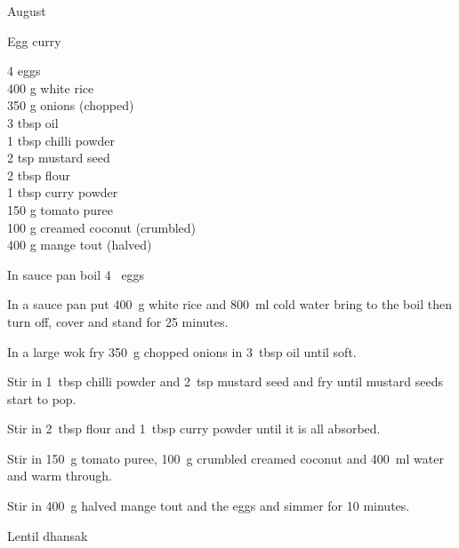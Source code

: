 \begin{menu}{August}
\begin{recipe}{2}{Egg curry}
		\begin{ingredients}
		4  eggs  \\
	400 g white rice  \\
	350 g onions (chopped) \\
	3 tbsp oil  \\
	1 tbsp chilli powder  \\
	2 tsp mustard seed  \\
	2 tbsp flour  \\
	1 tbsp curry powder  \\
	150 g tomato puree  \\
	100 g creamed coconut (crumbled) \\
	400 g mange tout (halved) \\
	
		\end{ingredients}
	
	
    \begin{instructions}
    \item 
        In sauce pan boil
        4~  eggs\item 
      In a
      sauce pan
      put
      400~g  white rice
      and
      800~ml  cold water
      bring to the boil then turn off, cover and stand for 25 minutes.
    \item 
        In a large wok fry
        350~g chopped onions
        in
        3~tbsp  oil
        until soft.
      \item 
        Stir in 1~tbsp  chilli powder
        and
        2~tsp  mustard seed
        and fry until mustard seeds start to pop.
      \item 
        Stir in
        2~tbsp  flour
        and
        1~tbsp  curry powder
        until it is all absorbed.
      \item 
        Stir in
        150~g  tomato puree,
        100~g crumbled creamed coconut
        and
        400~ml  water
        and warm through.
      \item 
        Stir in
        400~g halved mange tout
        and the eggs
        and simmer for 10 minutes.
      
    \end{instructions}
    \end{recipe}%
  
    \begin{recipe}{2}{Lentil dhansak}%
    

\end{recipe}
\end{menu}
